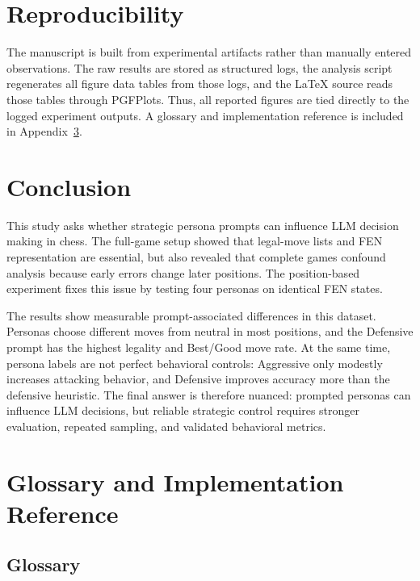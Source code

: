 \documentclass[10pt]{article}
\begin{document}
\section{Reproducibility}

The manuscript is built from experimental artifacts rather than manually entered observations. The raw results are stored as structured logs, the analysis script regenerates all figure data tables from those logs, and the LaTeX source reads those tables through PGFPlots. Thus, all reported figures are tied directly to the logged experiment outputs. A glossary and implementation reference is included in Appendix~\ref{app:glossary}.

\section{Conclusion}

This study asks whether strategic persona prompts can influence LLM decision making in chess. The full-game setup showed that legal-move lists and FEN representation are essential, but also revealed that complete games confound analysis because early errors change later positions. The position-based experiment fixes this issue by testing four personas on identical FEN states.

The results show measurable prompt-associated differences in this dataset. Personas choose different moves from neutral in most positions, and the Defensive prompt has the highest legality and Best/Good move rate. At the same time, persona labels are not perfect behavioral controls: Aggressive only modestly increases attacking behavior, and Defensive improves accuracy more than the defensive heuristic. The final answer is therefore nuanced: prompted personas can influence LLM decisions, but reliable strategic control requires stronger evaluation, repeated sampling, and validated behavioral metrics.




\appendix

\section{Glossary and Implementation Reference}
\label{app:glossary}

\subsection{Glossary}
\end{document}
